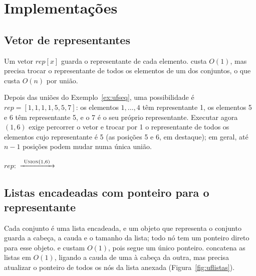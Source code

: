 \section{Implementações}\label{sec:ufimpl}
\subsection*{Vetor de representantes}
Um vetor $rep[x]$ guarda o representante de cada elemento. \Find{} custa $O(1)$, mas \Union{} precisa trocar o representante de todos os elementos de um dos conjuntos, o que custa $O(n)$ por união.

\begin{exemplo}\label{ex:ufvetor}
Depois das uniões do Exemplo~\ref{ex:ufseq}, uma possibilidade é $rep=[1,1,1,1,5,5,7]$: os elementos $1,\dots,4$ têm representante 1, os elementos 5 e 6 têm representante 5, e o 7 é o seu próprio representante. Executar agora \Union$(1,6)$ exige percorrer o vetor e trocar por 1 o representante de todos os elementos cujo representante é 5 (as posições 5 e 6, em destaque); em geral, até $n-1$ posições podem mudar numa única união.
\begin{figura}
\small $rep$:\ \quad$\xrightarrow{\ \textsc{Union}(1,6)\ }$\quad{}
\end{figura}
\end{exemplo}

\subsection*{Listas encadeadas com ponteiro para o representante}
Cada conjunto é uma lista encadeada, e um objeto que representa o conjunto guarda a cabeça, a cauda e o tamanho da lista; todo nó tem um ponteiro direto para esse objeto. \MakeSet{} e \Find{} custam $O(1)$, pois \Find{} segue um único ponteiro. \Union{} concatena as listas em $O(1)$, ligando a cauda de uma à cabeça da outra, mas precisa atualizar o ponteiro de todos os nós da lista anexada (Figura~\ref{fig:uflistas}).


